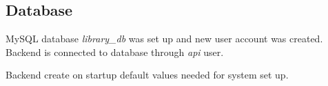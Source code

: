 \subsection{Database}
MySQL database \textit{library\_db} was set up and new user account was created. Backend is connected to database through \textit{api} user. 

Backend create on startup default values needed for system set up.